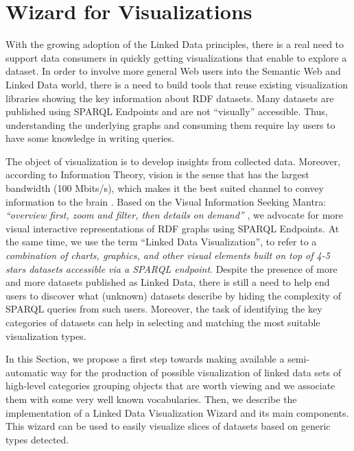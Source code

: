 \section{Wizard for Visualizations}


With the growing adoption of the Linked Data principles, there is a real need to support data consumers in quickly getting visualizations that enable to explore a dataset. In order to involve more general Web users into the Semantic Web and Linked Data world, there is a need to build tools that reuse existing visualization libraries showing the key information about RDF datasets. Many datasets are published using SPARQL Endpoints and are not ``visually'' accessible. Thus, understanding the underlying graphs and consuming them require lay users to have some knowledge in writing queries. 

The object of visualization is to develop insights from collected data. Moreover, according to Information Theory, vision is the sense that has the largest bandwidth (100 Mbits/s), which makes it the best suited channel to convey information to the brain \cite{Ware:2014}. Based on the Visual Information Seeking Mantra: \textit{``overview first, zoom and filter, then details on demand''} \cite{Shneiderman99}, we advocate for more visual interactive representations of RDF graphs using SPARQL Endpoints.   At the same time,  we use the term ``Linked Data Visualization'', to refer to a \textit{combination of charts, graphics, and other visual elements built on top of 4-5 stars datasets accessible via a SPARQL endpoint}. 
Despite the presence of more and more datasets published as Linked Data, there is still a need to help end users to discover what (unknown) datasets describe by hiding the complexity of SPARQL queries from such users. Moreover, the task of identifying the key categories of datasets can help in selecting and matching the most suitable visualization types.

In this Section, we propose a first step towards making available a semi-automatic way for the production of possible visualization of linked data sets of high-level categories grouping objects that are worth viewing and we associate them with some very well known vocabularies. Then, we describe the implementation of a Linked Data Visualization Wizard and its main components. This wizard can be used to easily visualize slices of datasets based on generic types detected.

